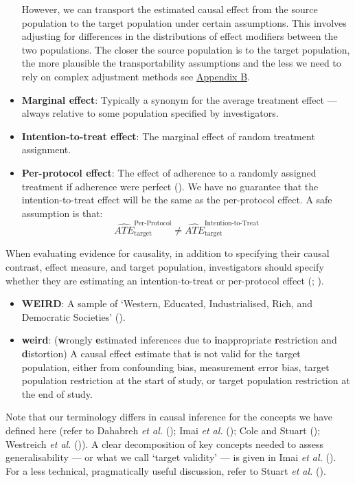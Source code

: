 \documentclass[
  single column]{article}
\begin{document}
\begin{itemize}
  However, we can transport the estimated causal effect from the source
  population to the target population under certain assumptions. This
  involves adjusting for differences in the distributions of effect
  modifiers between the two populations. The closer the source
  population is to the target population, the more plausible the
  transportability assumptions and the less we need to rely on complex
  adjustment methods see \hyperref[id-app-b]{Appendix B}.
\item
  \textbf{Marginal effect}: Typically a synonym for the average
  treatment effect --- always relative to some population specified by
  investigators.
\item
  \textbf{Intention-to-treat effect}: The marginal effect of random
  treatment assignment.
\item
  \textbf{Per-protocol effect}: The effect of adherence to a randomly
  assigned treatment if adherence were perfect
  (). We have no
  guarantee that the intention-to-treat effect will be the same as the
  per-protocol effect. A safe assumption is that: \[
  \widehat{ATE}_{\text{target}}^{\text{Per-Protocol}} \ne \widehat{ATE}_{\text{target}}^{\text{Intention-to-Treat}}
  \]
\end{itemize}

When evaluating evidence for causality, in addition to specifying their
causal contrast, effect measure, and target population, investigators
should specify whether they are estimating an intention-to-treat or
per-protocol effect (;
).

\begin{itemize}
\item
  \textbf{WEIRD}: A sample of `Western, Educated, Industrialised, Rich,
  and Democratic Societies' ().
\item
  \textbf{weird}: (\textbf{w}rongly \textbf{e}stimated inferences due to
  \textbf{i}nappropriate \textbf{r}estriction and \textbf{d}istortion) A
  causal effect estimate that is not valid for the target population,
  either from confounding bias, measurement error bias, target
  population restriction at the start of study, or target population
  restriction at the end of study.
\end{itemize}

Note that our terminology differs in causal inference for the concepts
we have defined here (refer to Dahabreh \emph{et al.}
(); Imai \emph{et al.}
(); Cole and Stuart
(); Westreich \emph{et al.}
()). A clear
decomposition of key concepts needed to assess generalisability --- or
what we call `target validity' --- is given in Imai \emph{et al.}
(). For a less technical,
pragmatically useful discussion, refer to Stuart \emph{et al.}
().
\end{document}
